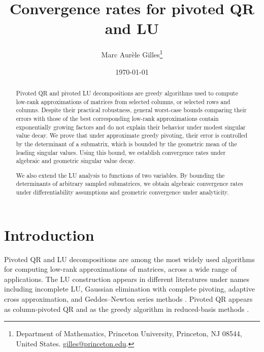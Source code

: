 \documentclass[11pt]{article}
\title{Convergence rates for pivoted QR and LU }%
\author{Marc Aur\`ele Gilles\thanks{Department of Mathematics, Princeton University, Princeton, NJ 08544, United States. \href{mailto:gilles@princeton.edu}{gilles@princeton.edu}.}}
\date{\today}
\theoremstyle{definition}
\theoremstyle{remark}
\begin{document}
\maketitle

\begin{abstract}
Pivoted QR and pivoted LU decompositions are greedy algorithms used to compute
low-rank approximations of matrices from selected columns, or selected rows and columns. Despite their practical robustness, general worst-case bounds comparing their errors with those of the best
corresponding low-rank approximations
contain exponentially growing factors and do not explain their behavior
under modest singular value decay. We prove that under approximate greedy pivoting, their error is
controlled by the determinant of a submatrix, which is bounded by the
geometric mean of the leading singular values. Using this bound, we establish convergence rates under
algebraic and geometric singular value decay.

We also extend the LU analysis to functions of two variables. By bounding
the determinants of arbitrary sampled submatrices, we obtain algebraic
convergence rates under differentiability assumptions and
geometric convergence under analyticity. 
\end{abstract}



\section{Introduction}

Pivoted QR and LU decompositions are among the most widely used algorithms for computing low-rank approximations
of matrices, across a wide range of applications. The LU construction appears in different literatures under
names including incomplete LU, Gaussian elimination with complete pivoting,
adaptive cross approximation, and Geddes--Newton series methods
\cite{Bebendorf2000,TownsendTrefethen2013,
CarvajalChapmanGeddes2005}. Pivoted QR appears as column-pivoted QR
\cite{BusingerGolub1965} and as the greedy
algorithm in reduced-basis methods \cite{BinevEtAl2011}.
\end{document}
